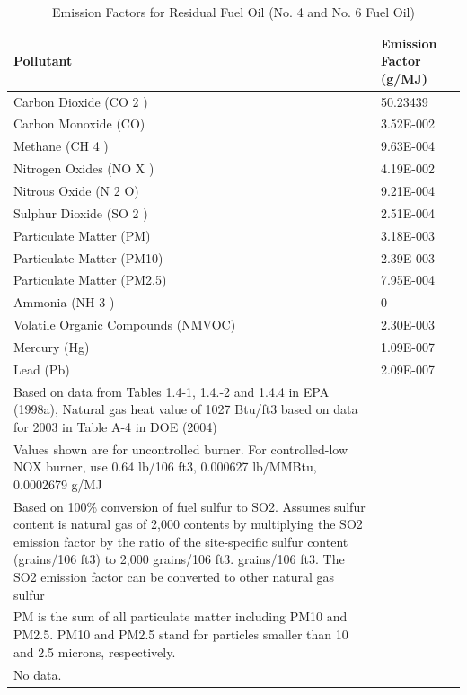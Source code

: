 \begin{longtable}[c]{p{4.5in}p{1.5in}}
\caption{  Emission Factors for Residual Fuel Oil (No. 4 and No. 6 Fuel Oil) \protect \label{table:emission-factors-for-residual-fuel-oil-no.-4}}\\
\toprule 
Pollutant & Emission Factor    (g/MJ) \tabularnewline \midrule
\endhead
Carbon Dioxide (CO 2 ) & 50.23439 \tabularnewline
Carbon Monoxide (CO) & 3.52E-002 \tabularnewline
Methane (CH 4 ) & 9.63E-004 \tabularnewline
Nitrogen Oxides (NO X ) & 4.19E-002 \tabularnewline
Nitrous Oxide (N 2 O) & 9.21E-004 \tabularnewline
Sulphur Dioxide (SO 2 ) & 2.51E-004 \tabularnewline
Particulate Matter (PM) & 3.18E-003 \tabularnewline
Particulate Matter (PM10) & 2.39E-003 \tabularnewline
Particulate Matter (PM2.5) & 7.95E-004 \tabularnewline
Ammonia (NH 3 ) & 0 \tabularnewline
Volatile Organic Compounds (NMVOC) & 2.30E-003 \tabularnewline
Mercury (Hg) & 1.09E-007 \tabularnewline
Lead (Pb) & 2.09E-007 \tabularnewline
Based on data from Tables 1.4-1, 1.4.-2 and 1.4.4 in EPA (1998a), Natural gas heat value of 1027 Btu/ft3 based on data for 2003 in Table A-4 in DOE (2004) \tabularnewline
Values shown are for uncontrolled burner. For controlled-low NOX burner, use 0.64 lb/106 ft3, 0.000627 lb/MMBtu, 0.0002679 g/MJ \tabularnewline
Based on 100\% conversion of fuel sulfur to SO2. Assumes sulfur content is natural gas of 2,000 contents by multiplying the SO2 emission factor by the ratio of the site-specific sulfur content (grains/106 ft3) to 2,000 grains/106 ft3. grains/106 ft3. The SO2 emission factor can be converted to other natural gas sulfur \tabularnewline
PM is the sum of all particulate matter including PM10 and PM2.5. PM10 and PM2.5 stand for particles smaller than 10 and 2.5 microns, respectively. \tabularnewline
No data. \tabularnewline
\bottomrule
\end{longtable}

